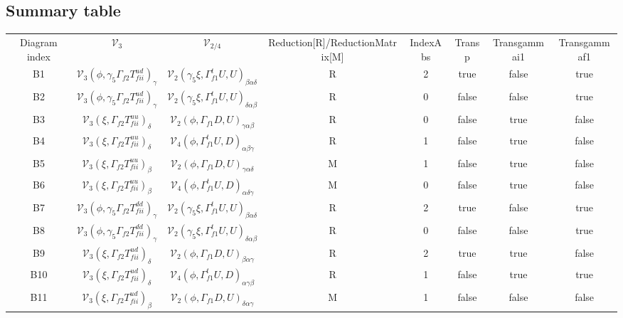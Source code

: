 \documentclass{article}[12pt]
\begin{document}
{
\begin{landscape}
\section{Summary table}
\begin{tabular}{ c c c c c c c c}
Diagram index & ${\mathcal V}_3$ & ${\mathcal V}_{2/4}$ & Reduction[R]/ReductionMatrix[M] & IndexAbs & Transp & Transgammai1 & Transgammaf1 \\
B1 & ${\mathcal V}_3(\phi,\gamma_5\Gamma_{f2}T^{ud}_{fii})_{\gamma}$ & ${\mathcal V}_2(\gamma_5\xi, \Gamma_{f1}^tU,U)_{\beta\alpha\delta}$  & R & 2 & true  & false & true \\ 
B2 & ${\mathcal V}_3(\phi,\gamma_5\Gamma_{f2}T^{ud}_{fii})_{\gamma}$ & ${\mathcal V}_2(\gamma_5\xi, \Gamma_{f1}^tU,U)_{\delta\alpha\beta}$  & R & 0 & false & false & true\\
B3 & ${\mathcal V}_3(\xi,\Gamma_{f2}T^{uu}_{fii})_{\delta}$ & ${\mathcal V}_2(\phi, \Gamma_{f1}  D,U)_{\gamma\alpha\beta}$  & R & 0 & false & true & false \\
B4 & ${\mathcal V}_3(\xi,\Gamma_{f2}T^{uu}_{fii})_{\delta}$ & ${\mathcal V}_4(\phi, \Gamma_{f1}^tU,D)_{\alpha\beta\gamma}$  & R & 1 & false & true & false \\
B5 & ${\mathcal V}_3(\xi,\Gamma_{f2}T^{uu}_{fii})_{\beta}$  & ${\mathcal V}_2(\phi, \Gamma_{f1}  D,U)_{\gamma\alpha\delta}$ & M & 1 & false & true & false \\
B6 & ${\mathcal V}_3(\xi,\Gamma_{f2}T^{uu}_{fii})_{\beta}$  & ${\mathcal V}_4(\phi, \Gamma_{f1}^tU,D)_{\alpha\delta\gamma}$ & M & 0 & false & true & false \\
B7 & ${\mathcal V}_3(\phi,\gamma_5\Gamma_{f2}T^{dd}_{fii})_{\gamma}$ & ${\mathcal V}_2(\gamma_5\xi, \Gamma_{f1}^tU,U)_{\beta\alpha\delta}$  & R & 2 & true  & false & true \\
B8 & ${\mathcal V}_3(\phi,\gamma_5\Gamma_{f2}T^{dd}_{fii})_{\gamma}$ & ${\mathcal V}_2(\gamma_5\xi, \Gamma_{f1}^tU,U)_{\delta\alpha\beta}$  & R & 0 & false & false & true \\
B9 & ${\mathcal V}_3(\xi,\Gamma_{f2}T^{ud}_{fii})_{\delta}$ & ${\mathcal V}_2(\phi, \Gamma_{f1}  D,U)_{\beta\alpha\gamma}$  & R & 2 & true  & true & false \\
B10& ${\mathcal V}_3(\xi,\Gamma_{f2}T^{ud}_{fii})_{\delta}$ & ${\mathcal V}_4(\phi, \Gamma_{f1}^tU,D)_{\alpha\gamma\beta}$  & R & 1 & false & true & true \\
B11& ${\mathcal V}_3(\xi,\Gamma_{f2}T^{ud}_{fii})_{\beta}$  & ${\mathcal V}_2(\phi, \Gamma_{f1}  D,U)_{\delta\alpha\gamma}$ & M & 1 & false  &false& false \\

\end{tabular}
\end{landscape}}
\end{document}
